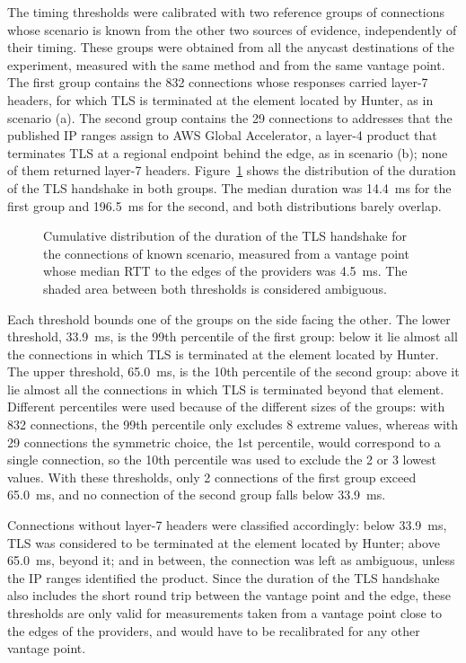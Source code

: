 The timing thresholds were calibrated with two reference groups of connections whose scenario is known from the other two sources of evidence, independently of their timing. These groups were obtained from all the anycast destinations of the experiment, measured with the same method and from the same vantage point. The first group contains the 832 connections whose responses carried layer-7 headers, for which TLS is terminated at the element located by Hunter, as in scenario (a). The second group contains the 29 connections to addresses that the published IP ranges assign to AWS Global Accelerator, a layer-4 product that terminates TLS at a regional endpoint behind the edge, as in scenario (b); none of them returned layer-7 headers. Figure~\ref{fig:anycast_experiments_tls_tcp_calibration} shows the distribution of the duration of the TLS handshake in both groups. The median duration was 14.4~ms for the first group and 196.5~ms for the second, and both distributions barely overlap.

\begin{figure}[ht]
    \centering
    
    \caption{Cumulative distribution of the duration of the TLS handshake for the connections of known scenario, measured from a vantage point whose median RTT to the edges of the providers was 4.5~ms. The shaded area between both thresholds is considered ambiguous.}
    \label{fig:anycast_experiments_tls_tcp_calibration}
\end{figure}

Each threshold bounds one of the groups on the side facing the other. The lower threshold, 33.9~ms, is the 99th percentile of the first group: below it lie almost all the connections in which TLS is terminated at the element located by Hunter. The upper threshold, 65.0~ms, is the 10th percentile of the second group: above it lie almost all the connections in which TLS is terminated beyond that element. Different percentiles were used because of the different sizes of the groups: with 832 connections, the 99th percentile only excludes 8 extreme values, whereas with 29 connections the symmetric choice, the 1st percentile, would correspond to a single connection, so the 10th percentile was used to exclude the 2 or 3 lowest values. With these thresholds, only 2 connections of the first group exceed 65.0~ms, and no connection of the second group falls below 33.9~ms.

Connections without layer-7 headers were classified accordingly: below 33.9~ms, TLS was considered to be terminated at the element located by Hunter; above 65.0~ms, beyond it; and in between, the connection was left as ambiguous, unless the IP ranges identified the product. Since the duration of the TLS handshake also includes the short round trip between the vantage point and the edge, these thresholds are only valid for measurements taken from a vantage point close to the edges of the providers, and would have to be recalibrated for any other vantage point.

